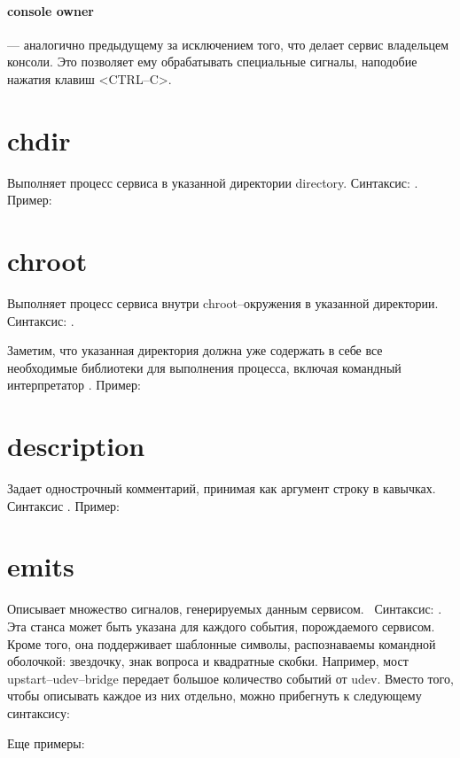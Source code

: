 \paragraph{console owner} --- аналогично предыдущему за исключением того, что делает сервис владельцем консоли. Это позволяет ему обрабатывать специальные сигналы, наподобие нажатия клавиш <CTRL--C>.

\section{chdir}

Выполняет процесс сервиса в указанной директории directory. Синтаксис: . Пример: \begin{alltt}
\end{alltt}

\section{chroot}

Выполняет процесс сервиса внутри chroot--окружения в указанной директории. Синтаксис: .

Заметим, что указанная директория должна уже содержать в себе все необходимые библиотеки для выполнения процесса, включая командный интерпретатор . Пример: \begin{alltt}
\end{alltt} 

\section{description}

Задает однострочный комментарий, принимая как аргумент строку в кавычках. Синтаксис . Пример: \begin{alltt}
\end{alltt}

\section{emits}

Описывает множество сигналов, генерируемых данным сервисом. 
~Синтаксис: .  Эта станса может быть указана для каждого события, порождаемого сервисом. Кроме того, она поддерживает шаблонные символы, распознаваемы командной оболочкой: звездочку, знак вопроса и квадратные скобки. Например, мост upstart--udev--bridge передает большое количество событий от udev. Вместо того, чтобы описывать каждое из них отдельно, можно прибегнуть к следующему синтаксису: \begin{alltt}
\end{alltt} Еще примеры: \begin{alltt}
\end{alltt}
